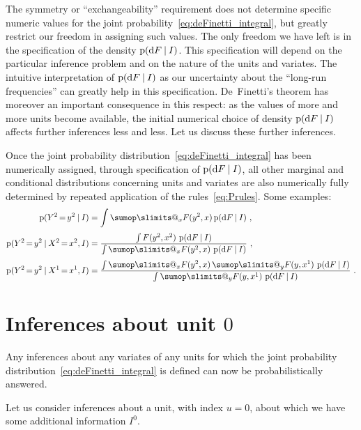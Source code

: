 \documentclass[\ifafour a4paper,12pt,\else a5paper,10pt,\fi%
onecolumn,oneside,article,%
british%
]{memoir}
\makeatletter
\theoremstyle{remark}
\theoremstyle{innote}
\def\sum{\DOTSI\sumop\slimits@}
\newcommand*{\di}{\mathrm{d}}%
\newcommand*{\p}{\mathrm{p}}%
\renewcommand*{\|}[1][]{\nonscript\:#1\vert\nonscript\:\mathopen{}}
\newcommand*{\mo}[1][=]{\mathord{\,#1\,}}
\makeatother
\begin{document}
The symmetry or \enquote{exchangeability} requirement does not determine specific numeric values for the joint probability~\eqref{eq:deFinetti_integral}, but greatly restrict our freedom in assigning such values. The only freedom we have left is in the specification of the density $\p(\di F \|I)$. This specification will depend on the particular inference problem and on the nature of the units and variates. The intuitive interpretation of $\p(\di F \|I)$ as our uncertainty about the \enquote{long-run frequencies} can greatly help in this specification. De~Finetti's theorem has moreover an important consequence in this respect: as the values of more and more units become available, the initial numerical choice of density $\p(\di F \|I)$ affects further inferences less and less. Let us discuss these further inferences.

Once the joint probability distribution~\eqref{eq:deFinetti_integral} has been numerically assigned, through specification of $\p(\di F \|I)$, all other marginal and conditional distributions concerning units and variates are also numerically fully determined by repeated application of the rules~\eqref{eq:Prules}. Some examples:
\begin{subequations}
    \label{eq:further_infs}
  \begin{align}
    \p(Y^{2}\mo y^{2} \|I) &=
    \int
    \sum_{x}F(y^{2},x)\,\p(\di F \|I) \ ,
    \\[\jot]
    \p(Y^{2}\mo y^{2} \| X^{2}\mo x^{2}, I) &=
    \frac{\int F(y^{2},x^{2})\ \p(\di F \|I)}{
      \int \sum_{x}F(y^{2},x)\ \p(\di F \|I)
    } \ ,
    \\[\jot]
    \p(Y^{2}\mo y^{2} \| X^{1}\mo x^{1}, I) &=
    \frac{\int \sum_{x}F(y^{2},x)\, \sum_{y}F(y,x^{1})\  \p(\di F \|I)}{
      \int \sum_{y}F(y,x^{1})\  \p(\di F \|I)
    } \ .
  \end{align}
\end{subequations}


\section{Inferences about unit $0$}
\label{sec:unit0}

Any inferences about any variates of any units for which the joint probability distribution~\eqref{eq:deFinetti_integral} is defined can now be probabilistically answered.

Let us consider inferences about a unit, with index $u=0$, about which we have some additional information $I^{0}$.
\end{document}
